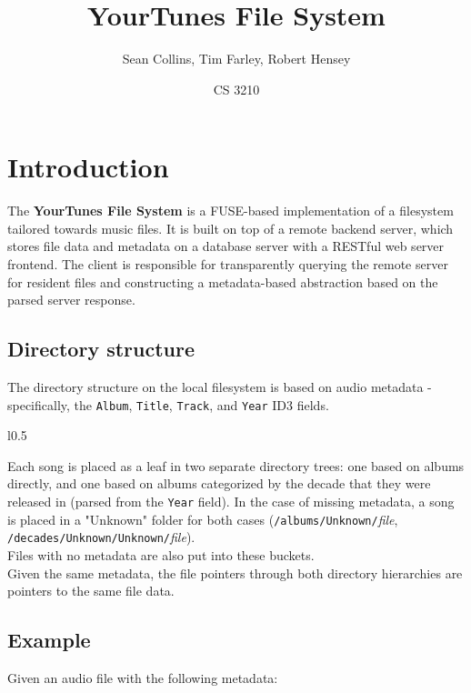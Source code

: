 \documentclass{article}
\title{YourTunes File System}
\date{CS 3210}
\author{Sean Collins, Tim Farley, Robert Hensey}
\begin{document}
	\maketitle
	\section{Introduction}
	The \textbf{YourTunes File System} is a FUSE-based implementation of a filesystem tailored towards music files. It is built on top of a remote backend server, which stores file data and metadata on a database server with a RESTful web server frontend. The client is responsible for transparently querying the remote server for resident files and constructing a metadata-based abstraction based on the parsed server response.
	
	\subsection{Directory structure}
	The directory structure on the local filesystem is based on audio metadata - specifically, the \texttt{Album}, \texttt{Title}, \texttt{Track}, and \texttt{Year} ID3 fields. 
	
	\vspace{0.01\textheight}
	
	\begin{wrapfigure}{l}{0.5\textwidth}
		\centering
		
	\end{wrapfigure}
	
	\noindent Each song is placed as a leaf in two separate directory trees: one based on albums directly, and one based on albums categorized by the decade that they were released in (parsed from the \texttt{Year} field). In the case of missing metadata, a song is placed in a "Unknown" folder for both cases (\texttt{/albums/Unknown/}\textit{file}, \texttt{/decades/Unknown/Unknown/}\textit{file}). \\ Files with no metadata are also put into these buckets. \\
	
	\noindent Given the same metadata, the file pointers through both directory hierarchies are pointers to the same file data. 
	
	\pagebreak \restoregeometry
	
	\subsection{Example}
	Given an audio file with the following metadata: \\
	
\end{document}
